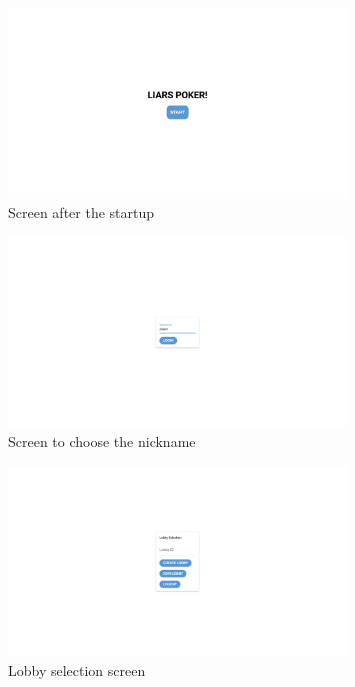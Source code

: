 \documentclass{scrartcl}
\begin{document}
\begin{figure}
      \centering
      \includegraphics[width=0.8\textwidth]{figures/startupScreenshot.png}
      \caption{Screen after the startup}
      \label{fig:screenshot1}
\end{figure}

\begin{figure}
      \centering
      \includegraphics[width=0.8\textwidth]{figures/loginScreenshot.png}
      \caption{Screen to choose the nickname}
      \label{fig:screenshot2}
\end{figure}

\begin{figure}
      \centering
      \includegraphics[width=0.8\textwidth]{figures/lobbySelectScreenshot.png}
      \caption{Lobby selection screen}
      \label{fig:screenshot3}
\end{figure}
\end{document}
